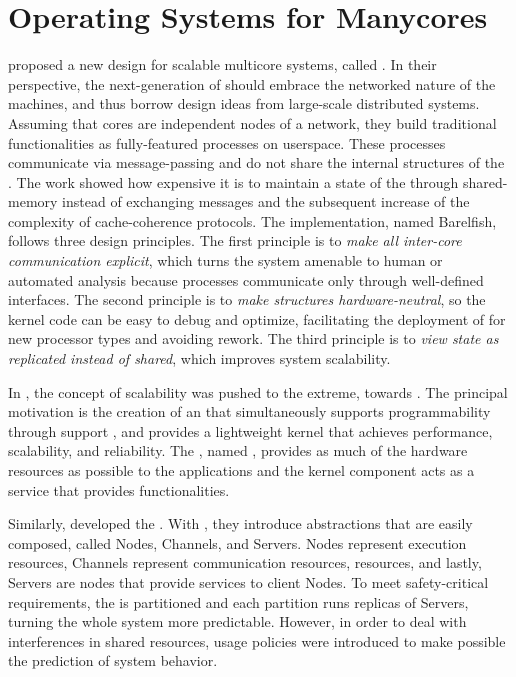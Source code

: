 \section{Operating Systems for Manycores}
\label{sec.works.os}

	 proposed a new \os design for scalable multicore
	systems, called \multikernel.
	In their perspective, the next-generation of \oss should embrace the networked nature
	of the machines, and thus borrow design ideas from large-scale distributed
	systems.
	Assuming that cores are independent nodes of a network, they build traditional
	\os functionalities as fully-featured processes on userspace.
	These processes communicate via message-passing and do not share the internal
	structures of the \os.
	The work showed how expensive it is to maintain a state of the \os through
	shared-memory instead of exchanging messages and the subsequent increase of
	the complexity of cache-coherence protocols.
	The \multikernel implementation, named Barelfish, follows three design principles.
	The first principle is to \textit{make all inter-core communication explicit}, which turns the system
	amenable to human or automated analysis because processes communicate only
	through well-defined interfaces.
	The second principle is to \textit{make \os structures hardware-neutral}, so the kernel
	code can be easy to debug and optimize, facilitating the deployment of \os for new
	processor types and avoiding rework.
	The third principle is to \textit{view \os state as replicated instead of shared}, which improves system
	scalability.

	In , the concept of scalability was pushed
	to the extreme, towards \hpc.
	The principal motivation is the creation of an \os that simultaneously supports
	programmability through support \linux \api, and provides a lightweight kernel
	that achieves performance, scalability, and reliability.
	The \os, named \mos, provides as much of the hardware resources as
	possible to the \hpc applications and the \linux kernel component
	acts as a service that provides \linux functionalities.

	Similarly,  developed the \moosca.
	With \moosca, they introduce abstractions that are easily composed, called Nodes,
	Channels, and Servers. Nodes represent execution resources, Channels represent communication
	resources, \eg \noc resources, and lastly, Servers are nodes that provide
	services to client Nodes.
	To meet safety-critical requirements, the \manycore is partitioned and each partition
	runs replicas of Servers, turning the whole system more predictable.
	However, in order to deal with interferences in shared resources,
	usage policies were introduced to make possible the prediction of system behavior.

